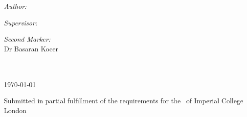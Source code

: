 \begin{titlepage}
\begin{minipage}{0.45\textwidth}
	\begin{flushleft} \large
	\emph{Author:}\\
	\reportauthor %
	\end{flushleft}
\end{minipage}
	\hfill
\begin{minipage}{0.26\textwidth}
	\begin{flushright} \large
	\emph{Supervisor:} \\
	\supervisor %
\end{flushright}
\end{minipage}
	\hfill
\begin{minipage}{0.26\textwidth}
	\begin{flushright} \large
	\emph{Second Marker:} \\
	Dr Basaran Kocer
	\end{flushright}
\end{minipage}\\[0.5cm]
	


 \\[1cm]
{\large \today} %


\vfill %
Submitted in partial fulfillment of the requirements for the \degreetype~of Imperial College London

\end{titlepage}
